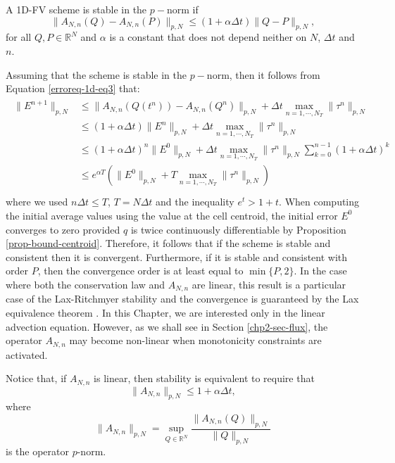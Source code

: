 \begin{definition}
	A 1D-FV scheme is stable in the $p-$norm if 
	\begin{equation}
		\|A_{N,n}(Q) - A_{N,n}(P)\|_{p,N} \leq (1+\alpha \Delta t)  \|Q-P\|_{p,N},
	\end{equation}
	for all $Q, P \in \mathbb{R}^N$ and $\alpha$ is a constant
	that does not depend neither on $N$, $\Delta t$ and $n$.
\end{definition}
Assuming that the scheme is stable in the $p-$norm, then it follows from Equation \eqref{erroreq-1d-eq3} that:
\begin{align}
	\begin{split}
	\|E^{n+1}\|_{p,N} 
	&\leq \|A_{N,n}(Q(t^n)) - A_{N,n}(Q^n)\|_{p,N} +  \Delta t \max_{n=1, \cdots, N_T}\|\tau^n\|_{p,N}\\
	&\leq (1+\alpha \Delta t)\|E^n\|_{p,N} +  \Delta t \max_{n=1, \cdots, N_T}\|\tau^n\|_{p,N}\\
	&\leq (1+\alpha \Delta t)^n\|E^0\|_{p,N} +  \Delta t \max_{n=1, \cdots, N_T}\|\tau^n\|_{p,N}
	\sum_{k=0}^{n-1} (1+\alpha \Delta t)^k\\
  &\leq e^{\alpha T}(\|E^0\|_{p,N} + T\max_{n=1, \cdots, N_T}\|\tau^n\|_{p,N}
) \\
	\end{split}
\end{align}
where we used $n \Delta t\leq T $, $T=N\Delta t$ and the inequality $e^t> 1+t$.
When computing the initial average values using the value at the cell centroid, 
the initial error $E^0$ converges to zero provided $q$ is twice continuously differentiable
by Proposition \ref{prop-bound-centroid}.
Therefore, it follows that if the scheme is stable and consistent
then it is convergent. 
Furthermore, if it is stable and consistent with order $P$, then
the convergence order is at least equal to $\min\{{P,2}\}$.
In the case where both the conservation law and $A_{N,n}$ are linear,
this result is a particular case of the Lax-Ritchmyer stability and the convergence
is guaranteed by the Lax equivalence theorem \citep{leveque:2002}.
In this Chapter, we are interested only in the linear advection equation.
However, as we shall see in Section \ref{chp2-sec-flux}, the operator $A_{N,n}$
may become non-linear when monotonicity constraints are activated.

Notice that, if $A_{N,n}$ is linear, then stability is equivalent to require that
\begin{equation*}
	\|A_{N,n}\|_{p,N} \leq 1+ \alpha \Delta t,
\end{equation*}
where
\begin{equation*}
	\|A_{N,n}\|_{p,N} = \sup_{Q\in \mathbb{R}^N} \frac{\|A_{N,n}(Q)\|_{p,N}}{\|Q\|_{p,N}}
\end{equation*}
is the operator $p$-norm.

